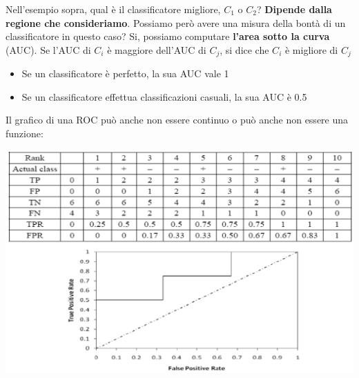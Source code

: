 \documentclass[12pt]{article}
\begin{document}
Nell'esempio sopra, qual è il classificatore migliore, $C_1$ o $C_2$?
\textbf{Dipende dalla regione che consideriamo}. Possiamo però avere una misura della bontà di un classificatore in questo caso?
Si, possiamo computare \textbf{l'area sotto la curva} (AUC).
Se l'AUC di $C_i$ è maggiore dell'AUC di $C_j$, si dice che $C_i$ è migliore di $C_j$
\begin{itemize}
    \item Se un classificatore è perfetto, la sua AUC vale 1
    \item Se un classificatore effettua classificazioni casuali, la sua AUC è 0.5
\end{itemize}
Il grafico di una ROC può anche non essere continuo o può anche non essere una funzione:
\begin{center}
    \includegraphics[width =1\linewidth]{Images/81.PNG}
\end{center}
\end{document}

